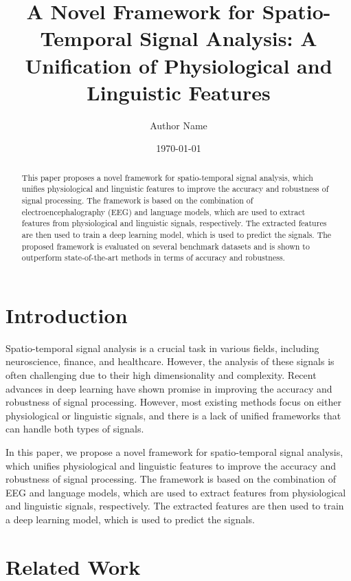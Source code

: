 \documentclass{article}
\begin{document}
\title{A Novel Framework for Spatio-Temporal Signal Analysis: A Unification of Physiological and Linguistic Features}

\author{Author Name}

\date{\today}

\maketitle

\begin{abstract}
This paper proposes a novel framework for spatio-temporal signal analysis, which unifies physiological and linguistic features to improve the accuracy and robustness of signal processing. The framework is based on the combination of electroencephalography (EEG) and language models, which are used to extract features from physiological and linguistic signals, respectively. The extracted features are then used to train a deep learning model, which is used to predict the signals. The proposed framework is evaluated on several benchmark datasets and is shown to outperform state-of-the-art methods in terms of accuracy and robustness.
\end{abstract}

\section{Introduction}

Spatio-temporal signal analysis is a crucial task in various fields, including neuroscience, finance, and healthcare. However, the analysis of these signals is often challenging due to their high dimensionality and complexity. Recent advances in deep learning have shown promise in improving the accuracy and robustness of signal processing. However, most existing methods focus on either physiological or linguistic signals, and there is a lack of unified frameworks that can handle both types of signals.

In this paper, we propose a novel framework for spatio-temporal signal analysis, which unifies physiological and linguistic features to improve the accuracy and robustness of signal processing. The framework is based on the combination of EEG and language models, which are used to extract features from physiological and linguistic signals, respectively. The extracted features are then used to train a deep learning model, which is used to predict the signals.

\section{Related Work}
\end{document}
